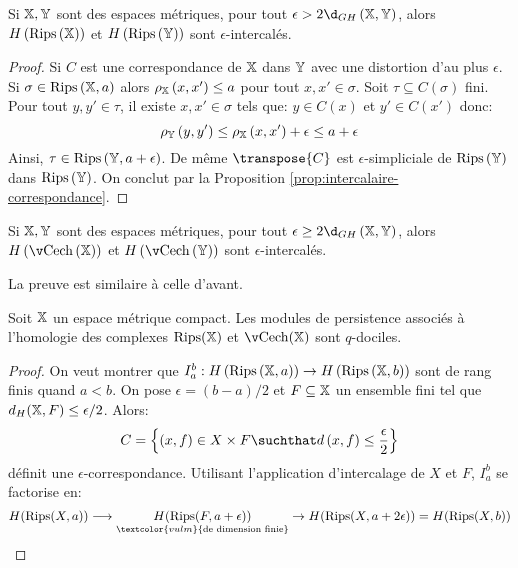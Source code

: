 \begin{proposition}
	Si $\mathbb{X}, \mathbb{Y}$ sont des espaces métriques, pour tout $\epsilon > 2\d_{GH}\left(\X, \Y\right)$, alors $H\left(\operatorname{Rips}\left(\mathbb{X}\right)\right)$ et $H\left(\operatorname{Rips}\left(\mathbb{Y}\right)\right)$ sont $\epsilon$-intercalés.
\end{proposition}
\begin{proof}
	Si $C$ est une correspondance de $\mathbb{X}$ dans $\mathbb{Y}$ avec une distortion d'au plus $\epsilon$.
	Si $\sigma \in \operatorname{Rips}\left(\mathbb{X}, a\right)$ alors $\rho_{\mathbb{X}}\left(x, x'\right) \leq a$ pour tout $x, x'\in \sigma$.
	Soit $\tau \subseteq C\left(\sigma\right)$ fini. Pour tout $y, y' \in \tau$, il existe $x, x'\in \sigma$ tels que:
	$y \in C\left(x\right)$ et $y'\in C\left(x'\right)$ donc:
	\begin{equation*}
		\rho_{\mathbb{Y}}\left(y, y'\right) \leq \rho_{\mathbb{X}}\left(x, x'\right) + \epsilon \leq a + \epsilon
	\end{equation*}
	Ainsi, $\tau \in \operatorname{Rips}\left(\mathbb{Y}, a + \epsilon\right)$.
	De même $\transpose{C}$ est $\epsilon$-simpliciale de $\operatorname{Rips}\left(\mathbb{Y}\right)$ dans $\operatorname{Rips}\left(\mathbb{Y}\right)$.
	On conclut par la Proposition \ref{prop:intercalaire-correspondance}.
\end{proof}

\begin{proposition}
	Si $\mathbb{X}, \mathbb{Y}$ sont des espaces métriques, pour tout $\epsilon \geq 2\d_{GH}\left(\X, \Y\right)$, alors $H\left(\cech\left(\X\right)\right)$ et $H\left(\cech\left(\Y\right)\right)$ sont $\epsilon$-intercalés.
\end{proposition}
La preuve est similaire à celle d'avant.

\begin{thm}
	Soit $\mathbb{X}$ un espace métrique compact. Les modules de persistence associés à l'homologie des complexes $\operatorname{Rips}(\mathbb{X})$ et $\cech(\X)$ sont $q$-dociles.
\end{thm}
\begin{proof}
	On veut montrer que $I_{a}^{b}: H\left(\operatorname{Rips}\left(\mathbb{X}, a\right)\right) \to H\left(\operatorname{Rips}\left(\mathbb{X}, b\right)\right)$ sont de rang finis quand $a < b$.
	On pose $\epsilon = (b - a) / 2$ et $F \subseteq \mathbb{X}$ un ensemble fini tel que $d_{H}(\mathbb{X}, F) \leq \epsilon / 2$.
	Alors:
	\begin{equation*}
		C = \left\{\left(x, f\right) \in X \times F \suchthat d\left(x, f\right) \leq \frac{\epsilon}{2}\right\}
	\end{equation*}
	définit une $\epsilon$-correspondance.
	Utilisant l'application d'intercalage de $X$ et $F$, $I_{a}^{b}$ se factorise en:
	\begin{equation*}
		H(\rips(X, a))\longrightarrow \underset{\textcolor{vulm}{\text{de dimension finie}}}{H(\rips(F, a + \epsilon))}\rightarrow H(\rips(X, a + 2\epsilon)) = H(\rips(X, b))
	\end{equation*}
\end{proof}

